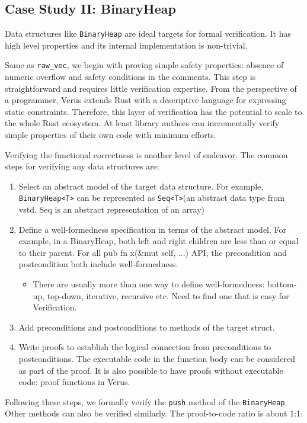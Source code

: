 \documentclass[conference]{IEEEtran}
\begin{document}
\subsection{Case Study II: BinaryHeap}
Data structures like \texttt{BinaryHeap} are ideal targets for formal verification. It has high level properties and its internal implementation is non-trivial. 

Same as \texttt{raw\_vec}, we begin with proving simple safety properties: absence of numeric overflow and safety conditions in the comments. This step is straightforward and requires little verification expertise. From the perspective of a programmer, Verus extends Rust with a descriptive language for expressing static constraints. Therefore, this layer of verification has the potential to scale to the whole Rust ecosystem. At least library authors can incrementally verify simple properties of their own code with minimum efforts.     

Verifying the functional correctness is another level of endeavor. The common steps for verifying any data structures are:
\begin{enumerate}
   \item Select an abstract model of the target data structure. For example, \texttt{BinaryHeap<T>} can be represented as \texttt{Seq<T>}(an abstract data type from vstd. Seq is an abstract representation of an array)
   \item Define a well-formedness specification in terms of the abstract model. For example, in a BinaryHeap, both left and right children are less than or equal to their parent. For all pub fn x(\&mut self, ...) API, the precondition and postcondition both include well-formedness. 
   \begin{itemize}
        \item There are usually more than one way to define well-formedness: bottom-up, top-down, iterative, recursive etc. Need to find one that is easy for Verification.
   \end{itemize}
   \item Add preconditions and postconditions to methods of the target struct.
   \item Write proofs to establish the logical connection from preconditions to postconditions. The executable code in the function body can be considered as part of the proof. It is also possible to have proofs without executable code: proof functions in Verus. 
\end{enumerate}

Following these steps, we formally verify the \texttt{push} method of the \texttt{BinaryHeap}. Other methods can also be verified similarly. The proof-to-code ratio is about 1:1:
\end{document}

